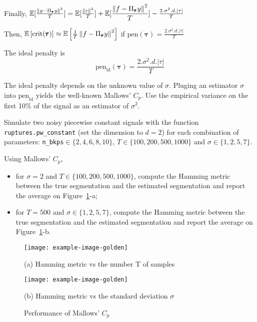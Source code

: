\documentclass[11pt]{article}
\begin{document}
\begin{solution}
\begin{itemize}
Finally, 
$\mathbb{E}[\frac{\left\lVert y - \Pi_{\pmb{\tau}}y\right\rVert^2}{T}]  = \mathbb{E}[\frac{\left\lVert \varepsilon\right\rVert^2}{T}] + \mathbb{E}[\dfrac{\left\lVert f - \Pi_{\pmb{\tau}}y\right\rVert^2}{T}] - \frac{2.\sigma^2.d.\vert \tau \vert}{T}$

\end{itemize}


Then, 
$\mathbb{E}\left[ \text{crit}(\pmb{\tau}) \right] \approx \mathbb{E}\left[ \frac{1}{T}\left\lVert f - \Pi_{\pmb{\tau}}y\right\rVert^2\right]$ 
if $\text{pen}(\pmb{\tau}) = \frac{2.\sigma^2.d.\vert \tau \vert}{T}$


The ideal penalty is 
\begin{equation}
    \text{pen}_{\text{id}} (\pmb{\tau}) = \frac{2.\sigma^2.d.\vert \tau \vert}{T}
\end{equation}
\end{solution}

\newpage
\begin{exercise}[subtitle=Mallows' $C_p$]
The ideal penalty depends on the unknown value of $\sigma$. Pluging an estimator $\hat{\sigma}$ into $\text{pen}_{\text{id}}$ yields the well-known Mallows' $C_p$. Use the empirical variance on the first 10\% of the signal as an estimator of $\sigma^2$.

Simulate two noisy piecewise constant signals with the function \texttt{ruptures.pw\_constant} (set the dimension to $d=2$) for each combination of parameters: \texttt{n\_bkps}$\in\{2, 4, 6, 8, 10\}$, $T\in \{100, 200, 500, 1000\}$ and $\sigma\in \{1, 2, 5, 7\}$.


Using Mallows' $C_p$,
\begin{itemize}
    \item for $\sigma = 2$ and $T\in \{100, 200, 500, 1000\}$, compute the Hamming metric between the true segmentation and the estimated segmentation and report the average on Figure~\ref{fig:simulation-mallows}-a;
    \item for $T = 500$ and $\sigma\in \{1, 2, 5, 7\}$, compute the Hamming metric between the true segmentation and the estimated segmentation and report the average on Figure~\ref{fig:simulation-mallows}-b.
\end{itemize}
\end{exercise}

\begin{solution}
\begin{figure}
    \centering
    \begin{minipage}[t]{0.45\textwidth}
    \centerline{\texttt{[image: example-image-golden]}}
    \centerline{(a) Hamming metric vs the number T of samples}
    \end{minipage}
    \hfill
    \begin{minipage}[t]{0.45\textwidth}    \centerline{\texttt{[image: example-image-golden]}}
    \centerline{(b) Hamming metric vs the standard deviation $\sigma$}
    \end{minipage}
    \caption{Performance of Mallows' $C_p$}\label{fig:simulation-mallows}
\end{figure}
\end{solution}
\end{document}
